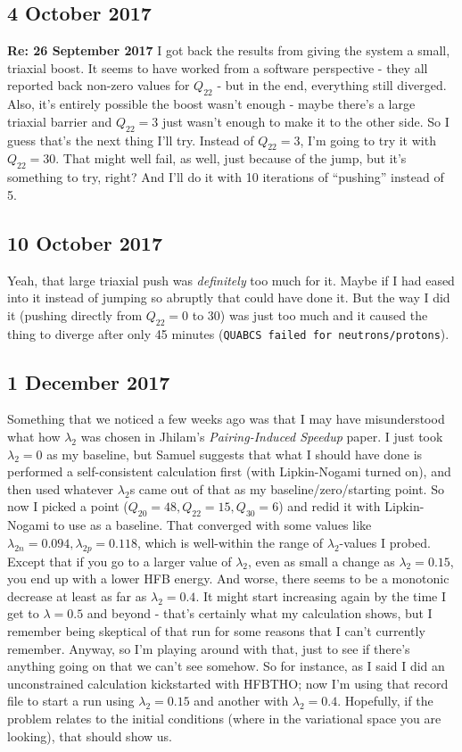 \subsection*{4 October 2017}
\textbf{Re: 26 September 2017} I got back the results from giving the system a small, triaxial boost. It seems to have worked from a software perspective - they all reported back non-zero values for $Q_{22}$ - but in the end, everything still diverged. Also, it's entirely possible the boost wasn't enough - maybe there's a large triaxial barrier and $Q_{22}=3$ just wasn't enough to make it to the other side. So I guess that's the next thing I'll try. Instead of $Q_{22}=3$, I'm going to try it with $Q_{22}=30$. That might well fail, as well, just because of the jump, but it's something to try, right? And I'll do it with 10 iterations of ``pushing'' instead of 5.

\subsection*{10 October 2017}
Yeah, that large triaxial push was \textit{definitely} too much for it. Maybe if I had eased into it instead of jumping so abruptly that could have done it. But the way I did it (pushing directly from $Q_{22}=0$ to $30$) was just too much and it caused the thing to diverge after only 45 minutes (\texttt{QUABCS failed for neutrons/protons}).

\subsection*{1 December 2017}
Something that we noticed a few weeks ago was that I may have misunderstood what how $\lambda_2$ was chosen in Jhilam's \textit{Pairing-Induced Speedup} paper. I just took $\lambda_2=0$ as my baseline, but Samuel suggests that what I should have done is performed a self-consistent calculation first (with Lipkin-Nogami turned on), and then used whatever $\lambda_2$s came out of that as my baseline/zero/starting point. So now I picked a point ($Q_{20}=48, Q_{22}=15, Q_{30}=6$) and redid it with Lipkin-Nogami to use as a baseline. That converged with some values like $\lambda_{2n}=0.094, \lambda_{2p}=0.118$, which is well-within the range of $\lambda_2$-values I probed. Except that if you go to a larger value of $\lambda_2$, even as small a change as $\lambda_2=0.15$, you end up with a lower HFB energy. And worse, there seems to be a monotonic decrease at least as far as $\lambda_2=0.4$. It might start increasing again by the time I get to $\lambda=0.5$ and beyond - that's certainly what my calculation shows, but I remember being skeptical of that run for some reasons that I can't currently remember. Anyway, so I'm playing around with that, just to see if there's anything going on that we can't see somehow. So for instance, as I said I did an unconstrained calculation kickstarted with HFBTHO; now I'm using that record file to start a run using  $\lambda_2=0.15$ and another with $\lambda_2=0.4$. Hopefully, if the problem relates to the initial conditions (where in the variational space you are looking), that should show us.

